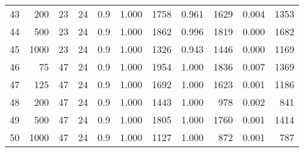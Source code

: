 \documentclass{article}
\begin{document}
\begin{tabular}{rrrrrrrrrrr}
  43 & 200 & 23 & 24 & 0.9 & 1.000 & 1758 & 0.961 & 1629 & 0.004 & 1353 \\ 
  44 & 500 & 23 & 24 & 0.9 & 1.000 & 1862 & 0.996 & 1819 & 0.000 & 1682 \\ 
  45 & 1000 & 23 & 24 & 0.9 & 1.000 & 1326 & 0.943 & 1446 & 0.000 & 1169 \\ 
   \hline
46 & 75 & 47 & 24 & 0.9 & 1.000 & 1954 & 1.000 & 1836 & 0.007 & 1369 \\ 
  47 & 125 & 47 & 24 & 0.9 & 1.000 & 1692 & 1.000 & 1623 & 0.001 & 1186 \\ 
  48 & 200 & 47 & 24 & 0.9 & 1.000 & 1443 & 1.000 & 978 & 0.002 & 841 \\ 
  49 & 500 & 47 & 24 & 0.9 & 1.000 & 1805 & 1.000 & 1760 & 0.001 & 1414 \\ 
  50 & 1000 & 47 & 24 & 0.9 & 1.000 & 1127 & 1.000 & 872 & 0.001 & 787 \\ 
   \hline
\end{tabular}
\newpage
\end{document}
